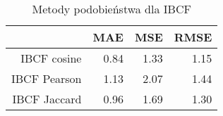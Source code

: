 \begin{table}[ht]
\centering
\begin{tabular}{rrrr}
  \hline
 & MAE & MSE & RMSE \\ 
  \hline
IBCF cosine & 0.84 & 1.33 & 1.15 \\ 
  IBCF Pearson & 1.13 & 2.07 & 1.44 \\ 
  IBCF Jaccard & 0.96 & 1.69 & 1.30 \\ 
   \hline
\end{tabular}
\caption{Metody podobieństwa dla IBCF} 
\end{table}

